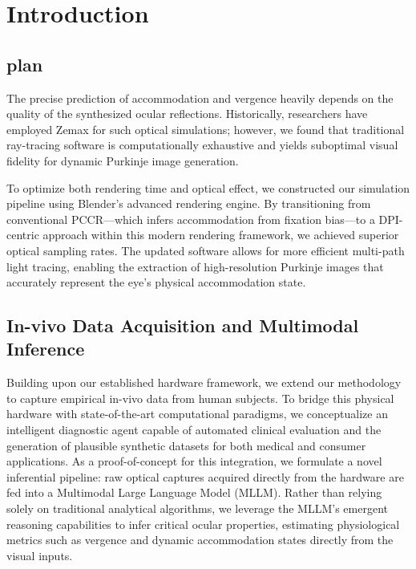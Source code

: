 \documentclass[sigconf, screen]{acmart}
\begin{document}
\section{Introduction}

\subsection{plan}

The precise prediction of accommodation and vergence heavily depends on the quality of the synthesized ocular reflections. 
Historically, researchers have employed Zemax for such optical simulations; however, we found that traditional ray-tracing software 
is computationally exhaustive and yields suboptimal visual fidelity for dynamic Purkinje image generation.

To optimize both rendering time and optical effect, we constructed our simulation pipeline using Blender's advanced rendering engine.
By transitioning from conventional PCCR—which infers accommodation from fixation bias—to a DPI-centric approach within this modern 
rendering framework, we achieved superior optical sampling rates. The updated software allows for more efficient multi-path light 
tracing, enabling the extraction of high-resolution Purkinje images that accurately represent the eye's physical accommodation state.

\subsection{In-vivo Data Acquisition and Multimodal Inference}
Building upon our established hardware framework, we extend our methodology to capture empirical in-vivo data from human subjects.
To bridge this physical hardware with state-of-the-art computational paradigms, we conceptualize an intelligent diagnostic agent 
capable of automated clinical evaluation and the generation of plausible synthetic datasets for both medical and consumer 
applications. As a proof-of-concept for this integration, we formulate a novel inferential pipeline: raw optical captures 
acquired directly from the hardware are fed into a Multimodal Large Language Model (MLLM). Rather than relying solely on 
traditional analytical algorithms, we leverage the MLLM's emergent reasoning capabilities to infer critical ocular properties,
estimating physiological metrics such as vergence and dynamic accommodation states directly from the visual inputs.
\end{document}
